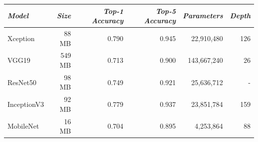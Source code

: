 \begin{table}[h!]
\centering
\footnotesize
\begin{tabular}{|l|r|r|r|r|r|}
\hline
\textbf{\textit{Model}}                                         & \textbf{\textit{Size}}            & \textbf{\textit{Top-1 Accuracy}}                                                          & \textbf{\textit{Top-5 Accuracy}}                                                          & \textbf{\textit{Parameters}}           & \textbf{\textit{Depth}}          \\ \hline
    Xception                                                     & 88 MB                              & 0.790                                                                                   & 0.945                                                                                   & 22,910,480                               & 126                                 \\ \hline
    VGG19                                                        & 549 MB                             & 0.713                                                                                   & 0.900                                                                                   & 143,667,240                              & 26                                  \\ \hline
    ResNet50                                                     & 98 MB                              & 0.749                                                                                   & 0.921                                                                                   & 25,636,712                               & -                                   \\ \hline
    InceptionV3                                                  & 92 MB                              & 0.779                                                                                   & 0.937                                                                                   & 23,851,784                               & 159                                 \\ \hline
    MobileNet                                                    & 16 MB                              & 0.704                                                                                   & 0.895                                                                                   & 4,253,864                                & 88                                  \\ \hline

\end{tabular}
\end{table}
